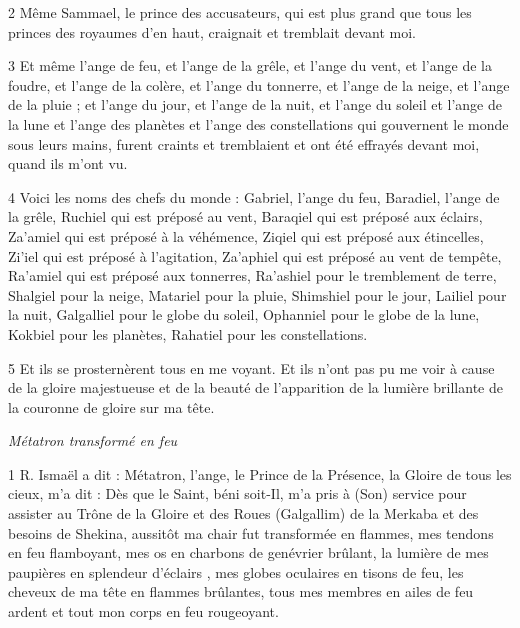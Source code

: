 \par 2 Même Sammael, le prince des accusateurs, qui est plus grand que tous les princes des royaumes d'en haut, craignait et tremblait devant moi.

\par 3 Et même l'ange de feu, et l'ange de la grêle, et l'ange du vent, et l'ange de la foudre, et l'ange de la colère, et l'ange du tonnerre, et l'ange de la neige, et l'ange de la pluie ; et l'ange du jour, et l'ange de la nuit, et l'ange du soleil et l'ange de la lune et l'ange des planètes et l'ange des constellations qui gouvernent le monde sous leurs mains, furent craints et tremblaient et ont été effrayés devant moi, quand ils m'ont vu.

\par 4 Voici les noms des chefs du monde : Gabriel, l'ange du feu, Baradiel, l'ange de la grêle, Ruchiel qui est préposé au vent, Baraqiel qui est préposé aux éclairs, Za'amiel qui est préposé à la véhémence, Ziqiel qui est préposé aux étincelles, Zi'iel qui est préposé à l'agitation, Za'aphiel qui est préposé au vent de tempête, Ra'amiel qui est préposé aux tonnerres, Ra'ashiel pour le tremblement de terre, Shalgiel pour la neige, Matariel pour la pluie, Shimshiel pour le jour, Lailiel pour la nuit, Galgalliel pour le globe du soleil, Ophanniel pour le globe de la lune, Kokbiel pour les planètes, Rahatiel pour les constellations.

\par 5 Et ils se prosternèrent tous en me voyant. Et ils n’ont pas pu me voir à cause de la gloire majestueuse et de la beauté de l’apparition de la lumière brillante de la couronne de gloire sur ma tête.


\par \textit{Métatron transformé en feu}

\par 1 R. Ismaël a dit : Métatron, l'ange, le Prince de la Présence, la Gloire de tous les cieux, m'a dit : Dès que le Saint, béni soit-Il, m'a pris à (Son) service pour assister au Trône de la Gloire et des Roues (Galgallim) de la Merkaba et des besoins de Shekina, aussitôt ma chair fut transformée en flammes, mes tendons en feu flamboyant, mes os en charbons de genévrier brûlant, la lumière de mes paupières en splendeur d'éclairs , mes globes oculaires en tisons de feu, les cheveux de ma tête en flammes brûlantes, tous mes membres en ailes de feu ardent et tout mon corps en feu rougeoyant.

